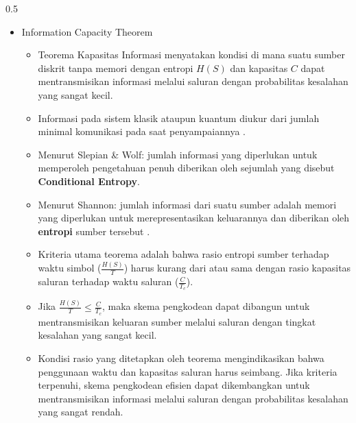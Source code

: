 \begin{frame}
\begin{columns}[T]
    \begin{column}{0.5\textwidth}
         \begin{itemize}
            \item Information Capacity Theorem\\
                \begin{itemize}
                \tiny \justifying
                    \item[$\Rightarrow$] Teorema Kapasitas Informasi menyatakan kondisi di mana suatu sumber diskrit tanpa memori dengan entropi $H(S)$ dan kapasitas $C$ dapat mentransmisikan informasi melalui saluran dengan probabilitas kesalahan yang sangat kecil.
                    \item[$\Rightarrow$] Informasi  pada sistem klasik ataupun kuantum  diukur dari jumlah minimal komunikasi pada saat penyampaiannya \cite{cerf1996quantum}.
                    \item[$\Rightarrow$] Menurut Slepian \& Wolf: jumlah informasi yang diperlukan untuk memperoleh pengetahuan penuh diberikan oleh sejumlah yang disebut \textbf{Conditional Entropy}.
                    \item[$\Rightarrow$] Menurut Shannon: jumlah informasi dari suatu sumber adalah memori yang diperlukan untuk merepresentasikan keluarannya dan diberikan oleh \textbf{entropi} sumber tersebut \cite{cerf1996quantum}.
                    \item[$\Rightarrow$] Kriteria utama teorema adalah bahwa rasio entropi sumber terhadap waktu simbol ($\frac{H(S)}{T}$) harus kurang dari atau sama dengan rasio kapasitas saluran terhadap waktu saluran ($\frac{C}{T_c}$).
                    \item[$\Rightarrow$] Jika $\frac{H(S)}{T} \leq \frac{C}{T_c}$, maka skema pengkodean dapat dibangun untuk mentransmisikan keluaran sumber melalui saluran dengan tingkat kesalahan yang sangat kecil.
                    \item[$\Rightarrow$] Kondisi rasio yang ditetapkan oleh teorema mengindikasikan bahwa penggunaan waktu dan kapasitas saluran harus seimbang. Jika kriteria terpenuhi, skema pengkodean efisien dapat dikembangkan untuk mentransmisikan informasi melalui saluran dengan probabilitas kesalahan yang sangat rendah.
                \end{itemize}
            \end{itemize}    
    \end{column}
   \end{columns}   
\end{frame}

